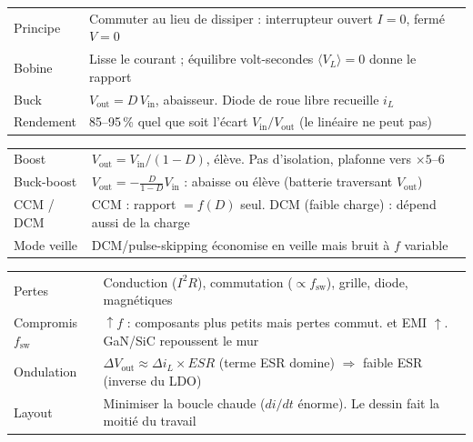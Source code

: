 \documentclass[12pt,a4paper,twoside]{book}
\begin{document}
\begin{bases}[title={\color{white} Résumé --- Les Bases}]
\begin{center}
\renewcommand{\arraystretch}{1.3}
\begin{tabular}{p{3.5cm}p{9.5cm}}
\toprule
Principe & Commuter au lieu de dissiper : interrupteur ouvert $I=0$, fermé $V=0$ \\
Bobine & Lisse le courant ; équilibre volt-secondes $\langle V_L\rangle = 0$ donne le rapport \\
Buck & $V_{\text{out}} = D\,V_{\text{in}}$, abaisseur. Diode de roue libre recueille $i_L$ \\
Rendement & 85--95\,\% quel que soit l'écart $V_{\text{in}}/V_{\text{out}}$ (le linéaire ne peut pas) \\
\bottomrule
\end{tabular}
\end{center}
\end{bases}

\begin{approfondissement}[title={\color{white} Résumé --- Approfondissement}]
\begin{center}
\renewcommand{\arraystretch}{1.3}
\begin{tabular}{p{3.5cm}p{9.5cm}}
\toprule
Boost & $V_{\text{out}} = V_{\text{in}}/(1-D)$, élève. Pas d'isolation, plafonne vers $\times 5$--$6$ \\
Buck-boost & $V_{\text{out}} = -\frac{D}{1-D}V_{\text{in}}$ : abaisse ou élève (batterie traversant $V_{\text{out}}$) \\
CCM / DCM & CCM : rapport $= f(D)$ seul. DCM (faible charge) : dépend aussi de la charge \\
Mode veille & DCM/pulse-skipping économise en veille mais bruit à $f$ variable \\
\bottomrule
\end{tabular}
\end{center}
\end{approfondissement}

\begin{ingenieur}[title={\color{white} Résumé --- Niveau Ingénieur}]
\begin{center}
\renewcommand{\arraystretch}{1.3}
\begin{tabular}{p{3.5cm}p{9.5cm}}
\toprule
Pertes & Conduction ($I^2R$), commutation ($\propto f_{\text{sw}}$), grille, diode, magnétiques \\
Compromis $f_{\text{sw}}$ & $\uparrow f$ : composants plus petits mais pertes commut. et EMI $\uparrow$. GaN/SiC repoussent le mur \\
Ondulation & $\Delta V_{\text{out}} \approx \Delta i_L \times ESR$ (terme ESR domine) $\Rightarrow$ faible ESR (inverse du LDO) \\
Layout & Minimiser la boucle chaude ($di/dt$ énorme). Le dessin fait la moitié du travail \\
\bottomrule
\end{tabular}
\end{center}
\end{ingenieur}
\end{document}
